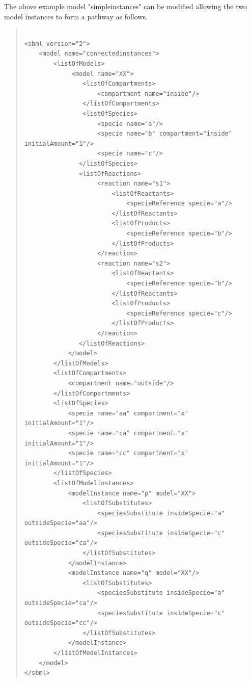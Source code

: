\documentclass[10pt]{article}
\newcommand{\tightspacing}{\renewcommand{\baselinestretch}{0.85}}
\newcommand{\regularspacing}{\renewcommand{\baselinestretch}{1.0}}
\begin{document}
The above example model "simpleinstances" can be modified allowing the two
model instances to form a pathway as follows.
\begin{quote}

  \begin{small}

    \tightspacing

\begin{verbatim}

<sbml version="2">
    <model name="connectedinstances">
        <listOfModels>
             <model name="XX">
                <listOfCompartments>
                    <compartment name="inside"/>
                </listOfCompartments>
                <listOfSpecies>
                    <specie name="a"/>
                    <specie name="b" compartment="inside" initialAmount="1"/>
                    <specie name="c"/>
               </listOfSpecies>
               <listOfReactions>
                    <reaction name="s1">
                        <listOfReactants>
                            <specieReference specie="a"/>
                        </listOfReactants>
                        <listOfProducts>
                            <specieReference specie="b"/>
                        </listOfProducts>
                    </reaction>
                    <reaction name="s2">
                        <listOfReactants>
                            <specieReference specie="b"/>
                        </listOfReactants>
                        <listOfProducts>
                            <specieReference specie="c"/>
                        </listOfProducts>
                    </reaction>
               </listOfReactions>
            </model>
        </listOfModels>
        <listOfCompartments>
            <compartment name="outside"/>
        </listOfCompartments>
        <listOfSpecies>
            <specie name="aa" compartment="x" initialAmount="1"/>
            <specie name="ca" compartment="x" initialAmount="1"/>
            <specie name="cc" compartment="x" initialAmount="1"/>
        </listOfSpecies>
        <listOfModelInstances>
            <modelInstance name="p" model="XX">
                <listOfSubstitutes>
                    <speciesSubstitute insideSpecie="a" outsideSpecie="aa"/>
                    <speciesSubstitute insideSpecie="c" outsideSpecie="ca"/>
                </listOfSubstitutes>
            </modelInstance>
            <modelInstance name="q" model="XX"/>
                <listOfSubstitutes>
                    <speciesSubstitute insideSpecie="a" outsideSpecie="ca"/>
                    <speciesSubstitute insideSpecie="c" outsideSpecie="cc"/>
                </listOfSubstitutes>
            </modelInstance>
        </listOfModelInstances>
    </model>
</sbml>

\end{verbatim}

    \regularspacing

  \end{small}

\end{quote}
\end{document}
